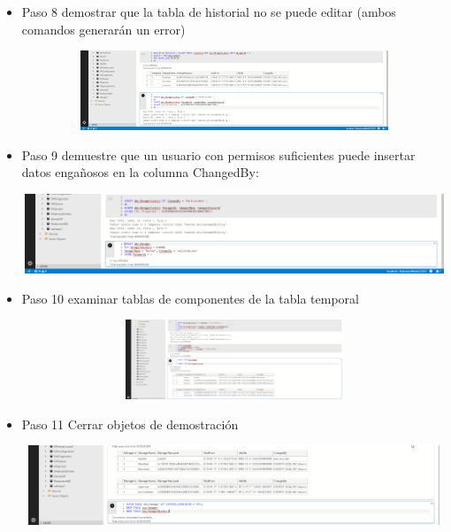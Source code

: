 \begin{itemize}
   				    \item Paso 8 demostrar que la tabla de historial no se puede editar (ambos comandos generarán un error)
				 
				 \begin{center}
    				\includegraphics[width=16cm, height=90]{./Imagenes/Imagen7}
   				    \end{center}   
   				    
   				    \item Paso 9 demuestre que un usuario con permisos suficientes puede insertar datos engañosos en la columna ChangedBy:
				 
				 \begin{center}
    				\includegraphics[width=16cm, height=90]{./Imagenes/Imagen8}
   				    \end{center}   
   				    \clearpage	
   				    \item Paso 10 examinar tablas de componentes de la tabla temporal
				 
				 \begin{center}
    				\includegraphics[width=16cm, height=90]{./Imagenes/Imagen9}
   				    \end{center} 	
   				    
   				     \item Paso 11 Cerrar objetos de demostración
				 
				 \begin{center}
    				\includegraphics[width=16cm, height=90]{./Imagenes/Imagen10}
   				    \end{center} 		 
				 
				 
				 
				  
				 				  
				   \end{itemize}
				   \clearpage

